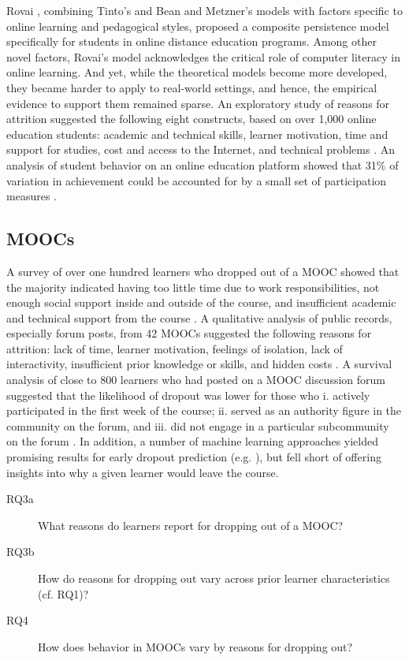 \documentclass{sigchi}\usepackage[]{graphicx}\usepackage[]{color}
\begin{document}
Rovai \citeyear{rovai2003search}, combining Tinto's and Bean and Metzner's models with factors specific to online learning and pedagogical styles, proposed a composite persistence model specifically for students in online distance education programs. Among other novel factors, Rovai's model acknowledges the critical role of computer literacy in online learning. And yet, while the theoretical models become more developed, they became harder to apply to real-world settings, and hence, the empirical evidence to support them remained sparse. An exploratory study of reasons for attrition suggested the following eight constructs, based on over 1,000 online education students: academic and technical skills, learner motivation, time and support for studies, cost and access to the Internet, and technical problems \cite{muilenburg2005student}. An analysis of student behavior on an online education platform showed that 31\% of variation in achievement could be accounted for by a small set of participation measures \cite{morris2005tracking}.

\subsection{MOOCs}

A survey of over one hundred learners who dropped out of a MOOC showed that the majority indicated having too little time due to work responsibilities, not enough social support inside and outside of the course, and insufficient academic and technical support from the course \cite{gutl2014attrition}. A qualitative analysis of public records, especially forum posts, from 42 MOOCs suggested the following reasons for attrition: lack of time, learner motivation, feelings of isolation, lack of interactivity, insufficient prior knowledge or skills, and hidden costs \cite{khalil2014moocs}. A survival analysis of close to 800 learners who had posted on a MOOC discussion forum suggested that the likelihood of dropout was lower for those who i. actively participated in the first week of the course; ii. served as an authority figure in the community on the forum, and iii. did not engage in a particular subcommunity on the forum \cite{yang2013turn}. In addition, a number of machine learning approaches yielded promising results for early dropout prediction (e.g. \cite{taylor2014likely,halawa2014dropout}), but fell short of offering insights into why a given learner would leave the course.

\begin{description}
\item[RQ3a] What reasons do learners report for dropping out of a MOOC?
\item[RQ3b] How do reasons for dropping out vary across prior learner characteristics (cf. RQ1)?
\item[RQ4] How does behavior in MOOCs vary by reasons for dropping out?
\end{description}  
\end{document}
